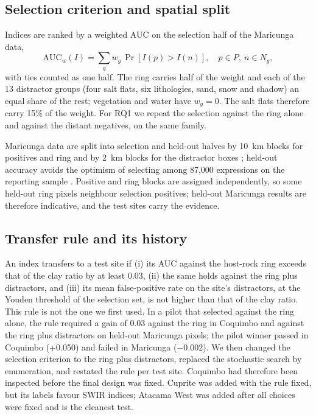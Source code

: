 \documentclass[pdflatex,sn-basic]{sn-jnl}
\begin{document}
\subsection{Selection criterion and spatial split}
\label{sec:split}

Indices are ranked by a weighted AUC on the selection half of the Maricunga data,
\begin{equation}
\mathrm{AUC}_w(I) = \sum_g w_g \, \Pr\left[I(p) > I(n)\right], \quad p \in P,\ n \in N_g,
\label{eq:wauc}
\end{equation}
with ties counted as one half. The ring carries half of the weight and each of the 13 distractor groups (four salt flats, six lithologies, sand, snow and shadow) an equal share of the rest; vegetation and water have $w_g = 0$. The salt flats therefore carry 15\% of the weight. For RQ1 we repeat the selection against the ring alone and against the distant negatives, on the same family.

Maricunga data are split into selection and held-out halves by \SI{10}{\kilo\meter} blocks for positives and ring and by \SI{2}{\kilo\meter} blocks for the distractor boxes \citep{Roberts2017,Meyer2022}; held-out accuracy avoids the optimism of selecting among 87{,}000 expressions on the reporting sample \citep{Ambroise2002}. Positive and ring blocks are assigned independently, so some held-out ring pixels neighbour selection positives; held-out Maricunga results are therefore indicative, and the test sites carry the evidence.

\subsection{Transfer rule and its history}
\label{sec:gate}

An index transfers to a test site if (i) its AUC against the host-rock ring exceeds that of the clay ratio by at least 0.03, (ii) the same holds against the ring plus distractors, and (iii) its mean false-positive rate on the site's distractors, at the Youden threshold of the selection set, is not higher than that of the clay ratio. This rule is not the one we first used. In a pilot that selected against the ring alone, the rule required a gain of 0.03 against the ring in Coquimbo and against the ring plus distractors on held-out Maricunga pixels; the pilot winner passed in Coquimbo (+0.050) and failed in Maricunga ($-0.002$). We then changed the selection criterion to the ring plus distractors, replaced the stochastic search by enumeration, and restated the rule per test site. Coquimbo had therefore been inspected before the final design was fixed. Cuprite was added with the rule fixed, but its labels favour SWIR indices; Atacama West was added after all choices were fixed and is the cleanest test.
\end{document}

